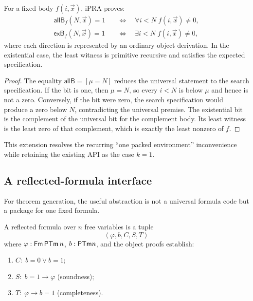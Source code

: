 \begin{theorem}\label{thm:allk}
For a fixed body \(f(i,\vec x)\), iPRA proves:
\begin{align*}
 \mathsf{allB}_f(N,\vec x)=1
 &\quad\Longleftrightarrow\quad
 \forall i<N\;f(i,\vec x)\ne0,\\
 \mathsf{exB}_f(N,\vec x)=1
 &\quad\Longleftrightarrow\quad
 \exists i<N\;f(i,\vec x)\ne0,
\end{align*}
where each direction is represented by an ordinary object derivation.  In the existential case, the
least witness is primitive recursive and satisfies the expected specification.
\end{theorem}

\begin{proof}
The equality \(\mathsf{allB}= [\mu=N]\) reduces the universal statement to the search
specification.  If the bit is one, then \(\mu=N\), so every \(i<N\) is below \(\mu\) and hence is not
a zero.  Conversely, if the bit were zero, the search specification would produce a zero below
\(N\), contradicting the universal premise.  The existential bit is the complement of the universal
bit for the complement body.  Its least witness is the least zero of that complement, which is
exactly the least nonzero of \(f\).
\end{proof}

This extension resolves the recurring ``one packed environment'' inconvenience while retaining the
existing API as the case \(k=1\).

\subsection{A reflected-formula interface}

For theorem generation, the useful abstraction is not a universal formula code but a package for one
fixed formula.

\begin{definition}
A reflected formula over \(n\) free variables is a tuple
\[
  (\varphi,b,C,S,T)
\]
where \(\varphi:\mathsf{Fm}\,\mathsf{PTm}\,n\), \(b:\mathsf{PTm} n\), and the object proofs establish:
\begin{enumerate}
\item \(C:\;b=0\lor b=1\);
\item \(S:\;b=1\to\varphi\) (soundness);
\item \(T:\;\varphi\to b=1\) (completeness).
\end{enumerate}
\end{definition}

